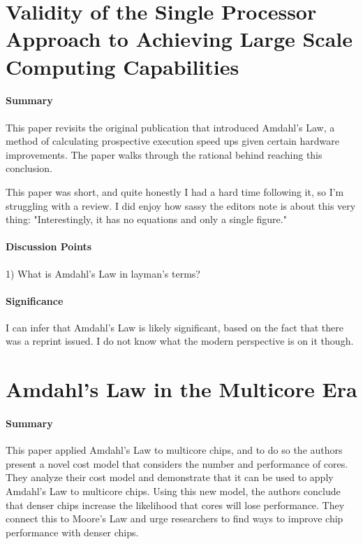 \section {Validity of the Single Processor Approach to Achieving Large Scale
Computing Capabilities \cite{amdahl1967validity}}


\paragraph{\textbf{Summary}}
This paper revisits the original publication that introduced Amdahl's Law,
a method of calculating prospective execution speed ups given certain
hardware improvements. The paper walks through the rational behind reaching
this conclusion.

This paper was short, and quite honestly I had a hard time following it, so
I'm struggling with a review. I did enjoy how sassy the editors note is
about this very thing: "Interestingly, it has no equations and only a single
figure."
\paragraph{\textbf{Discussion Points}}
1) What is Amdahl's Law in layman's terms?
\paragraph{\textbf{Significance}}
I can infer that Amdahl's Law is likely significant, based on the fact that
there was a reprint issued. I do not know what the modern perspective is on
it though.


\section {Amdahl’s Law in the Multicore Era \cite{hill2008amdahl}}


\paragraph{\textbf{Summary}}
This paper applied Amdahl's Law to multicore chips, and to do so the authors
present a novel cost model that considers the number and performance of
cores. They analyze their cost model and demonstrate that it can be used to
apply Amdahl's Law to multicore chips. Using this new model, the authors
conclude that denser chips increase the likelihood that cores will lose
performance. They connect this to Moore's Law and urge researchers to find
ways to improve chip performance with denser chips.

